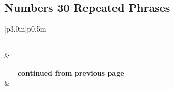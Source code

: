 \subsection{Numbers 30 Repeated Phrases}


\normalsize
 
\begin{center}
\begin{longtable}{|p{3.0in}|p{0.5in}|}
\caption[Numbers 30 Repeated Phrases]{Numbers 30 Repeated Phrases}\label{table:Repeated Phrases Numbers 30} \\
\hline {} &  \\ \hline 
\endfirsthead
 
{{\bfseries \tablename\ \thetable{} -- continued from previous page}} \\  
\hline {} &  \\ \hline 
\endhead
 

\end{longtable}
\end{center}
